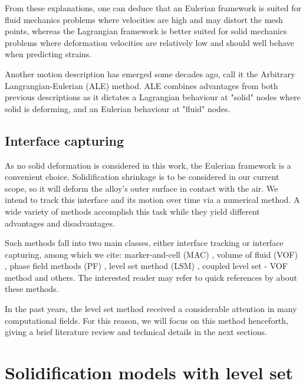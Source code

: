 From these explanations, one can deduce that an Eulerian framework is suited for fluid mechanics problems where 
velocities are high and may distort the mesh points, whereas the Lagrangian framework is better suited for solid mechanics 
problems where deformation velocities are relatively low and should well behave when predicting strains.

Another motion description has emerged some decades ago, \citet{hirt_arbitrary_1971} call it the Arbitrary Langrangian-Eulerian (ALE) method. 
ALE combines advantages from both previous descriptions as it dictates a Lagrangian behaviour at "solid" nodes where solid is deforming, and
an Eulerian behaviour at "fluid" nodes.
%
%
\subsection{Interface capturing}

As no solid deformation is considered in this work, the Eulerian framework is a convenient choice. Solidification shrinkage is 
to be considered in our current scope, so it will deform the alloy's outer surface in contact with the air.
We intend to track this interface and its motion over time via a numerical method. A wide variety of methods accomplish this 
task while they yield different advantages and disadvantages. 

Such methods fall into two main classes, either interface tracking
or interface capturing, among which we cite: marker-and-cell (MAC) \citep{harlow_numerical_1965}, volume of fluid (VOF) \citep{hirt_volume_1981}, 
phase field methods (PF) \citep{karma_phase-field_1996,beckermann_modeling_1999}, level set method (LSM) \citep{osher_fronts_1988}, coupled level set - VOF method and others. 
The interested reader may refer to quick references by \citet{prosperetti_navier-stokes_2002,maitre_review_2006} about these methods.

In the past years, the level set method received a considerable attention in many computational fields.
For this reason, we will focus on this method henceforth, giving a brief literature review and technical details in the next sections.
%
\section{Solidification models with level set}

